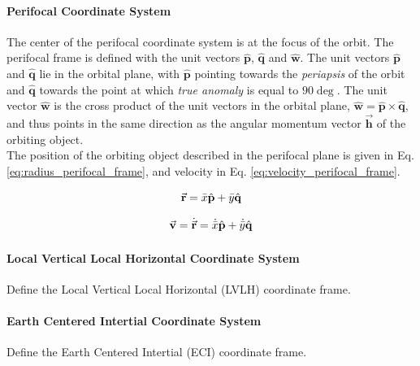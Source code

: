 \paragraph{Perifocal Coordinate System} 
The center of the perifocal coordinate system is at the focus of the orbit. The perifocal frame is defined with the unit vectors $\hat{\mathbf{p}}$, $\hat{\mathbf{q}}$ and $\hat{\mathbf{w}}$. The unit vectors $\hat{\mathbf{p}}$ and $\hat{\mathbf{q}}$ lie in the orbital plane, with $\hat{\mathbf{p}}$ pointing towards the \textit{periapsis} of the orbit and $\hat{\mathbf{q}}$ towards the point at which \textit{true anomaly} is equal to $90 \deg$. The unit vector $\hat{\mathbf{w}}$ is the cross product of the unit vectors in the orbital plane, $\hat{\mathbf{w}} = \hat{\mathbf{p}} \times \hat{\mathbf{q}}$, and thus points in the same direction as the angular momentum vector $\Vec{\mathbf{h}}$ of the orbiting object. \\

The position of the orbiting object described in the perifocal plane is given in Eq. \ref{eq:radius_perifocal_frame}, and velocity in Eq. \ref{eq:velocity_perifocal_frame}.

\begin{equation}
    \Vec{\mathbf{r}} = \Bar{x}\hat{\mathbf{p}} + \Bar{y}\hat{\mathbf{q}}
    \label{eq:radius_perifocal_frame}
\end{equation}

\begin{equation}
    \Vec{\mathbf{v}} = \dot{\Vec{\mathbf{r}}} = \dot{\Bar{x}}\hat{\mathbf{p}} + \dot{\Bar{y}}\hat{\mathbf{q}}
    \label{eq:velocity_perifocal_frame}
\end{equation}


\paragraph{Local Vertical Local Horizontal Coordinate System} 

Define the Local Vertical Local Horizontal (LVLH) coordinate frame. \\  

\paragraph{Earth Centered Intertial Coordinate System} 

Define the Earth Centered Intertial (ECI) coordinate frame. \\


